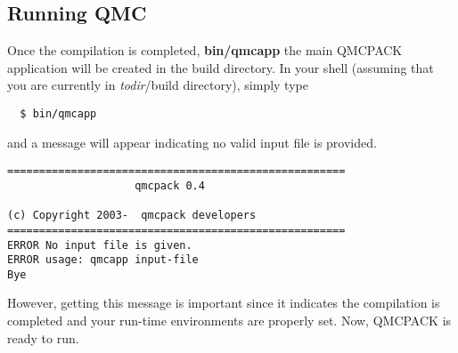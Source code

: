 \subsection{Running QMC}

Once the compilation is completed, \textbf{bin/qmcapp} the main QMCPACK
application will be created in the build directory.  In your shell (assuming
that you are currently in \emph{todir}/build directory), simply type

\begin{verbatim}
  $ bin/qmcapp 
\end{verbatim}
and a message will appear indicating no valid input file is provided. 
 
\begin{lstlisting}[float]
=====================================================
                    qmcpack 0.4                       

(c) Copyright 2003-  qmcpack developers            
=====================================================
ERROR No input file is given.
ERROR usage: qmcapp input-file
Bye \end{lstlisting}
  

However, getting this message is important since it indicates the compilation
is completed and your run-{}time environments are properly set.  Now, QMCPACK
is ready to run.
 

